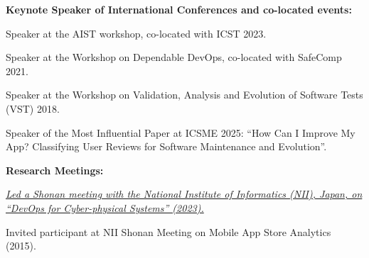 \documentclass[11pt]{article}
\begin{document}
\medskip 

\textbf{Keynote Speaker of International Conferences and co-located events:}
\begin{innerlist}
\item Speaker at the AIST workshop, co-located with ICST 2023.
\item Speaker at the Workshop on Dependable DevOps, co-located with SafeComp 2021.
\item Speaker at the Workshop on Validation, Analysis and Evolution of Software Tests (VST) 2018.
\item Speaker of the Most Influential Paper at ICSME 2025: ``How Can I Improve My App? Classifying User Reviews for Software Maintenance and Evolution''.
\end{innerlist}

\medskip 

\textbf{Research Meetings:}
\begin{innerlist}
   \item \emph{\href{https://shonan.nii.ac.jp/seminars/204/}{Led a Shonan meeting with the National Institute of Informatics (NII), Japan, on ``DevOps for Cyber-physical Systems'' (2023).}}
   \item Invited participant at NII Shonan Meeting on Mobile App Store Analytics (2015).
\end{innerlist}

\medskip\medskip\medskip






\medskip 

\end{document}
